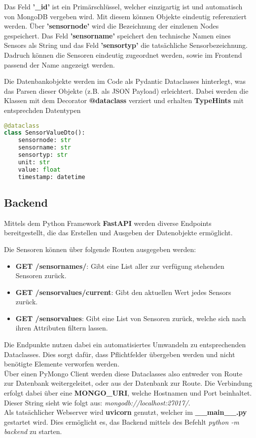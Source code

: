 Das Feld \textbf{'\_id'} ist ein Primärschlüssel, welcher einzigartig ist und automatisch von MongoDB vergeben wird. 
Mit diesem können Objekte eindeutig referenziert werden.
Über \textbf{'sensornode'} wird die Bezeichnung der einzlenen Nodes gespeichert.
Das Feld \textbf{'sensorname'} speichert den technische Namen eines Sensors als String und das Feld \textbf{'sensortyp'} die tatsächliche Sensorbezeichnung. 
Dadruch können die Sensoren eindeutig zugeordnet werden, sowie im Frontend passend der Name angezeigt werden.

Die Datenbankobjekte werden im Code als Pydantic Dataclasses hinterlegt, was das Parsen dieser Objekte (z.B. als JSON Payload) erleichtert. 
Dabei werden die Klassen mit dem Decorator \textbf{@dataclass} verziert und erhalten \textbf{TypeHints} mit entsprechden Datentypen

\begin{lstlisting}[language=python,caption={Sensor Dataclass},captionpos=b,showstringspaces=false, basicstyle=\small,label={lst:dataclass}]
@dataclass
class SensorValueDto():
    sensornode: str
    sensorname: str
    sensortyp: str
    unit: str
    value: float
    timestamp: datetime
\end{lstlisting}

\subsection{Backend}
Mittels dem Python Framework \textbf{FastAPI} werden diverse Endpoints bereitgestellt, die das Erstellen und Ausgeben der Datenobjekte ermöglicht.

Die Sensoren können über folgende Routen ausgegeben werden:
\begin{itemize}
\item \textbf{GET /sensornames/}: Gibt eine List aller zur verfügung stehenden Sensoren zurück.
\item \textbf{GET /sensorvalues/current}: Gibt den aktuellen Wert jedes Sensors zurück.
\item \textbf{GET /sensorvalues}: Gibt eine List von Sensoren zurück, welche sich nach ihren Attributen filtern lassen.
\end{itemize}

Die Endpunkte nutzen dabei ein automatisiertes Umwandeln zu entsprechenden Dataclasses.
Dies sorgt dafür, dass Pflichtfelder übergeben werden und nicht benötigte Elemente verworfen werden.\\
Über einen PyMongo Client werden diese Dataclasses also entweder von Route zur Datenbank weitergeleitet, oder aus der Datenbank zur Route.
Die Verbindung erfolgt dabei über eine \textbf{MONGO\_URI}, welche Hostnamen und Port beinhaltet. Dieser String sieht wie folgt aus: \textit{mongodb://localhost:27017/}. \\
Als tatsächlicher Webserver wird \textbf{uvicorn} genutzt, welcher im \textbf{\_\_main\_\_.py} gestartet wird. Dies ermöglicht es, das Backend mittels des Befehlt \textit{python -m backend} zu starten.

